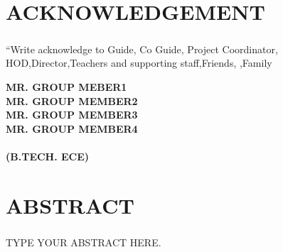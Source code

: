 \documentclass[12pt]{report}	%
\begin{document}
\thisfancypage{\setlength{\fboxsep}{10pt}\doublebox}{}	
\pagestyle{fancy}

\chapter*{ACKNOWLEDGEMENT}
\paragraph{}``Write acknowledge to Guide, Co Guide, Project Coordinator, HOD,Director,Teachers and supporting staff,Friends, ,Family




\begin{flushright}
{
\begin{minipage}{2.3 in}

\vspace*{0.8in}
\textbf{MR. GROUP MEBER1}\\
\textbf{MR. GROUP MEMBER2}\\
\textbf{MR. GROUP MEMBER3}\\
\textbf{MR. GROUP MEMBER4}\\
\textbf{}\\
\vspace*{0.1in}
\textbf{(B.TECH. ECE)}


\end{minipage}} \hfill
\end{flushright}
\newpage
	\thisfancypage{\setlength{\fboxsep}{10pt}\doublebox}{}	
	\thisfancypage{\setlength{\fboxsep}{10pt}\doublebox}{}	

\chapter*{ABSTRACT}
\paragraph{}TYPE YOUR ABSTRACT HERE.

\newpage
	\thisfancypage{\setlength{\fboxsep}{10pt}\doublebox}{}	
\tableofcontents	\thisfancypage{\setlength{\fboxsep}{10pt}\doublebox}{}	
\end{document}
